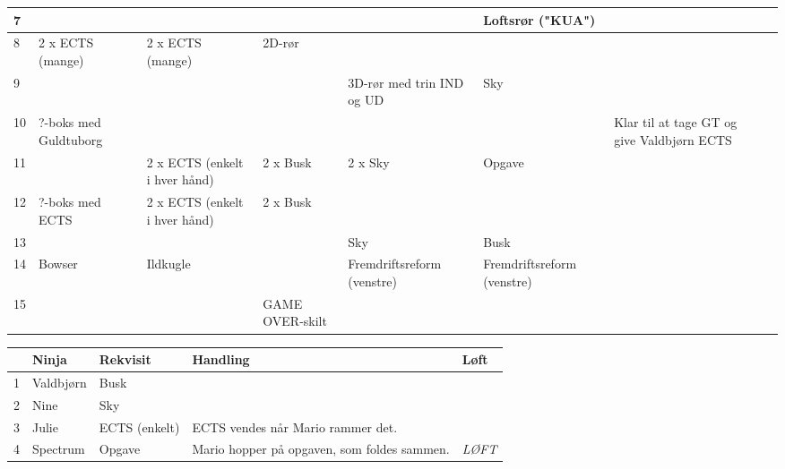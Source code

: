 \documentclass[a4paper,11pt]{article}
\begin{document}
\begin{sketch}
\begin{landscape}
\begin{table}
\begin{tabular}{l||p{2.7cm}|p{2.7cm}|p{2.7cm}|p{2.7cm}|p{2.7cm}|p{2.7cm}|p{2.7cm}|}
  \cellcolor[gray]{0.9} 7 & & & & & \cellcolor{yellow} Loftsrør ("KUA") & & \\ \hline

  \cellcolor[gray]{0.9} 8 & 2 x ECTS (mange) & 2 x ECTS (mange) & 2D-rør & & & & \\ \hline

  \cellcolor[gray]{0.9} 9 & & & & \cellcolor{yellow} 3D-rør med trin IND og UD & Sky & & \\ \hline

  \cellcolor[gray]{0.9} 10 & ?-boks med Guldtuborg & & & & & Klar til at tage GT og give Valdbjørn ECTS & \\ \hline

  \cellcolor[gray]{0.9} 11 & & 2 x ECTS (enkelt i hver hånd) & 2 x Busk & 2 x Sky & Opgave & & \\ \hline

  \cellcolor[gray]{0.9} 12 & ?-boks med ECTS & 2 x ECTS (enkelt i hver hånd) & 2 x Busk & & & & \\ \hline

  \cellcolor[gray]{0.9} 13 & & & & Sky & Busk & & \\ \hline

  \cellcolor[gray]{0.9} 14 & Bowser & \cellcolor{yellow} Ildkugle & & Fremdriftsreform (venstre) & Fremdriftsreform (venstre) & & \\ \hline

  \cellcolor[gray]{0.9} 15 & & & GAME OVER-skilt & & & & \\ \hline

\end{tabular}
\end{table}
\end{landscape}
\restoregeometry

\begin{longtable}{|l||p{2cm}|p{3cm}|p{6.5cm}|p{1.3cm}|}
  \hline
  \cellcolor[gray]{0.9} & \cellcolor[gray]{0.9} \textbf{Ninja} & \cellcolor[gray]{0.9} \textbf{Rekvisit} & \cellcolor[gray]{0.9} \textbf{Handling} & \cellcolor[gray]{0.9} \textbf{Løft} \\ \hline \hline

  1 & Valdbjørn & Busk & & \\ \hline

  2 & Nine & Sky & & \\ \hline

  3 & Julie & ECTS (enkelt) & ECTS vendes når Mario rammer det. & \\ \hline

  4 & Spectrum & Opgave & Mario hopper på opgaven, som foldes sammen. & \textit{LØFT} \\ \hline


\end{longtable}
\end{sketch}
\end{document}
